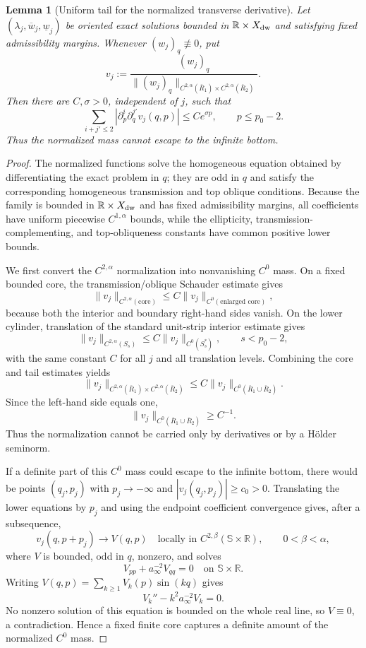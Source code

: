\documentclass[11pt,reqno]{amsart}
\numberwithin{equation}{section}
\newtheorem{lemma}[theorem]{Lemma}
\theoremstyle{definition}
\theoremstyle{remark}
\begin{document}
\begin{lemma}[Uniform tail for the normalized transverse derivative]
\label{lem5.4-tail}
Let $(\lambda_j,\overline w_j,\underline w_j)$ be oriented exact
solutions bounded in $\mathbb R\times X_{\rm dw}$ and satisfying fixed
admissibility margins.  Whenever $(w_j)_q\not\equiv0$, put
\[
 v_j:=\frac{(w_j)_q}
 {\|(w_j)_q\|_{C^{2,\alpha}(\overline R_1)
 \times C^{2,\alpha}(\overline R_2)}}.
\]
Then there are $C,\sigma>0$, independent of $j$, such that
\[
 \sum_{i+j'\le2}|\partial_p^i\partial_q^{j'}v_j(q,p)|
 \le Ce^{\sigma p},\qquad p\le p_0-2.
\]
Thus the normalized mass cannot escape to the infinite bottom.
\end{lemma}
\begin{proof}
The normalized functions solve the homogeneous equation obtained by
differentiating the exact problem in $q$; they are odd in $q$ and
satisfy the corresponding homogeneous transmission and top oblique
conditions.  Because the family is bounded in
$\mathbb R\times X_{\rm dw}$ and has fixed admissibility margins, all
coefficients have uniform piecewise $C^{1,\alpha}$ bounds, while the
ellipticity, transmission-complementing, and top-obliqueness constants
have common positive lower bounds.

We first convert the $C^{2,\alpha}$ normalization into nonvanishing
$C^0$ mass.  On a fixed bounded core, the transmission/oblique
Schauder estimate gives
\[
 \|v_j\|_{C^{2,\alpha}(\text{core})}
 \le C\|v_j\|_{C^0(\text{enlarged core})},
\]
because both the interior and boundary right-hand sides vanish.  On
the lower cylinder, translation of the standard unit-strip interior
estimate gives
\[
 \|v_j\|_{C^{2,\alpha}(S_s)}
 \le C\|v_j\|_{C^0(S_s^*)},
 \qquad s<p_0-2,
\]
with the same constant $C$ for all $j$ and all translation levels.
Combining the core and tail estimates yields
\begin{equation}\label{eq:normalized-v-schauder}
 \|v_j\|_{C^{2,\alpha}(\overline R_1)
 \times C^{2,\alpha}(\overline R_2)}
 \le C\|v_j\|_{C^0(\overline R_1\cup\overline R_2)}.
\end{equation}
Since the left-hand side equals one,
\[
 \|v_j\|_{C^0(\overline R_1\cup\overline R_2)}\ge C^{-1}.
\]
Thus the normalization cannot be carried only by derivatives or by a
H\"older seminorm.

If a definite part of this $C^0$ mass could escape to the infinite
bottom, there would be points $(q_j,p_j)$ with $p_j\to-\infty$ and
$|v_j(q_j,p_j)|\ge c_0>0$.  Translating the lower equations by $p_j$
and using the endpoint coefficient convergence gives, after a
subsequence,
\[
 v_j(q,p+p_j)\longrightarrow V(q,p)
 \quad\text{locally in }C^{2,\beta}(\mathbb S\times\mathbb R),
 \qquad 0<\beta<\alpha,
\]
where $V$ is bounded, odd in $q$, nonzero, and solves
\[
 V_{pp}+a_\infty^{-2}V_{qq}=0
 \quad\text{on }\mathbb S\times\mathbb R.
\]
Writing $V(q,p)=\sum_{k\ge1}V_k(p)\sin(kq)$ gives
\[
 V_k''-k^2a_\infty^{-2}V_k=0.
\]
No nonzero solution of this equation is bounded on the whole real
line, so $V\equiv0$, a contradiction.  Hence a fixed finite core
captures a definite amount of the normalized $C^0$ mass.


\end{proof}
\end{document}
